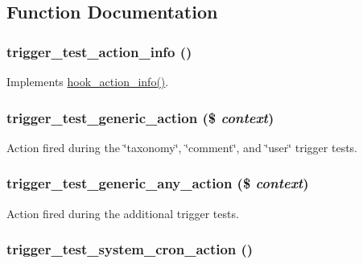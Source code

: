 \subsection{Function Documentation}
\hypertarget{trigger__test_8module_aeadfec612e28d35f8f5fb79df39ca987}{
\subsubsection[{trigger\_\-test\_\-action\_\-info}]{\setlength{\rightskip}{0pt plus 5cm}trigger\_\-test\_\-action\_\-info ()}}
\label{trigger__test_8module_aeadfec612e28d35f8f5fb79df39ca987}
Implements \hyperlink{group__actions_ga3df26c5d6496c91fcd0edd8648023fb4}{hook\_\-action\_\-info()}. \hypertarget{trigger__test_8module_a7cb17b51e7178a36ba912bbe495f729a}{
\subsubsection[{trigger\_\-test\_\-generic\_\-action}]{\setlength{\rightskip}{0pt plus 5cm}trigger\_\-test\_\-generic\_\-action (\$ {\em context})}}
\label{trigger__test_8module_a7cb17b51e7178a36ba912bbe495f729a}
Action fired during the \char`\"{}taxonomy\char`\"{}, \char`\"{}comment\char`\"{}, and \char`\"{}user\char`\"{} trigger tests. \hypertarget{trigger__test_8module_a7d16a0032e36971b0c1dab972b7e76ee}{
\subsubsection[{trigger\_\-test\_\-generic\_\-any\_\-action}]{\setlength{\rightskip}{0pt plus 5cm}trigger\_\-test\_\-generic\_\-any\_\-action (\$ {\em context})}}
\label{trigger__test_8module_a7d16a0032e36971b0c1dab972b7e76ee}
Action fired during the additional trigger tests. \hypertarget{trigger__test_8module_a861d1c1fafd3ac6801b62db0b72734f2}{
\subsubsection[{trigger\_\-test\_\-system\_\-cron\_\-action}]{\setlength{\rightskip}{0pt plus 5cm}trigger\_\-test\_\-system\_\-cron\_\-action ()}}
